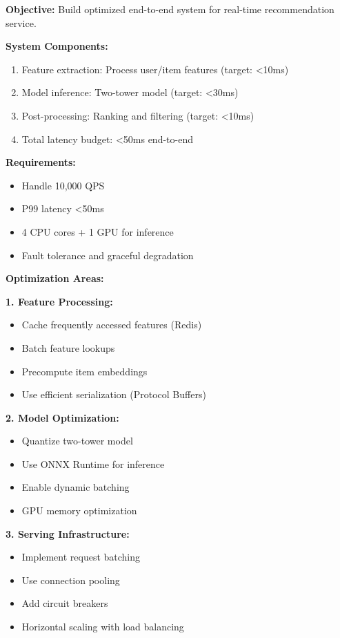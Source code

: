\textbf{Objective:} Build optimized end-to-end system for real-time recommendation service.

\textbf{System Components:}
\begin{enumerate}
    \item Feature extraction: Process user/item features (target: <10ms)
    \item Model inference: Two-tower model (target: <30ms)
    \item Post-processing: Ranking and filtering (target: <10ms)
    \item Total latency budget: <50ms end-to-end
\end{enumerate}

\textbf{Requirements:}
\begin{itemize}
    \item Handle 10,000 QPS
    \item P99 latency <50ms
    \item 4 CPU cores + 1 GPU for inference
    \item Fault tolerance and graceful degradation
\end{itemize}

\textbf{Optimization Areas:}

\textbf{1. Feature Processing:}
\begin{itemize}
    \item Cache frequently accessed features (Redis)
    \item Batch feature lookups
    \item Precompute item embeddings
    \item Use efficient serialization (Protocol Buffers)
\end{itemize}

\textbf{2. Model Optimization:}
\begin{itemize}
    \item Quantize two-tower model
    \item Use ONNX Runtime for inference
    \item Enable dynamic batching
    \item GPU memory optimization
\end{itemize}

\textbf{3. Serving Infrastructure:}
\begin{itemize}
    \item Implement request batching
    \item Use connection pooling
    \item Add circuit breakers
    \item Horizontal scaling with load balancing
\end{itemize}


